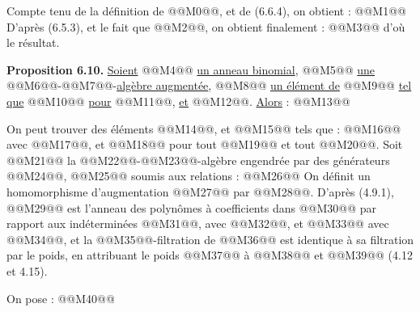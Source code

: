 
Compte tenu de la définition de @@M0@@, et de (6.6.4), on obtient :
@@M1@@
D'après (6.5.3), et le fait que @@M2@@, on obtient finalement :
@@M3@@
d'où le résultat.

\textbf{Proposition 6.10.} \uline{Soient} @@M4@@ \uline{un anneau binomial}, @@M5@@ \uline{une} @@M6@@-@@M7@@-\uline{algèbre augmentée}, @@M8@@ \uline{un élément de} @@M9@@ \uline{tel que} @@M10@@ \uline{pour} @@M11@@, \uline{et} @@M12@@. \uline{Alors} :
@@M13@@

On peut trouver des éléments @@M14@@, et @@M15@@ tels que :
@@M16@@
avec @@M17@@, et @@M18@@ pour tout @@M19@@ et tout @@M20@@. Soit @@M21@@ la @@M22@@-@@M23@@-algèbre engendrée par des générateurs @@M24@@, @@M25@@ soumis aux relations :
@@M26@@
On définit un homomorphisme d'augmentation @@M27@@ par @@M28@@. D'après (4.9.1), @@M29@@ est l'anneau des polynômes à coefficients dans @@M30@@ par rapport aux indéterminées @@M31@@, avec @@M32@@, et @@M33@@ avec @@M34@@, et la @@M35@@-filtration de @@M36@@ est identique à sa filtration par le poids, en attribuant le poids @@M37@@ à @@M38@@ et @@M39@@ (4.12 et 4.15).

On pose :
@@M40@@
